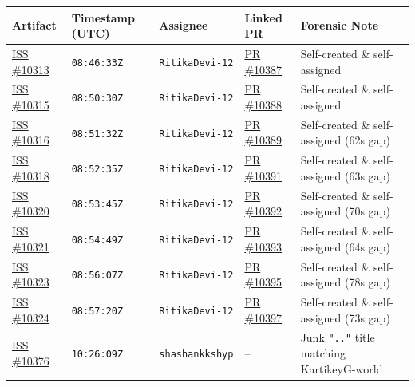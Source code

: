 \documentclass[11pt,a4paper]{article}
\begin{document}
\vspace{4pt}
\begin{center}
\small
\begin{tabular}{@{}llllp{6.4cm}@{}}
\toprule
\textbf{Artifact} & \textbf{Timestamp (UTC)} & \textbf{Assignee} & \textbf{Linked PR} & \textbf{Forensic Note} \\
\midrule
\href{https://github.com/SatyamPandey-07/WorkSphere/issues/10313}{ISS \#10313} & \texttt{08:46:33Z} & \texttt{RitikaDevi-12} & \href{https://github.com/SatyamPandey-07/WorkSphere/pull/10387}{PR \#10387} & Self-created \& self-assigned \\
\href{https://github.com/SatyamPandey-07/WorkSphere/issues/10315}{ISS \#10315} & \texttt{08:50:30Z} & \texttt{RitikaDevi-12} & \href{https://github.com/SatyamPandey-07/WorkSphere/pull/10388}{PR \#10388} & Self-created \& self-assigned \\
\href{https://github.com/SatyamPandey-07/WorkSphere/issues/10316}{ISS \#10316} & \texttt{08:51:32Z} & \texttt{RitikaDevi-12} & \href{https://github.com/SatyamPandey-07/WorkSphere/pull/10389}{PR \#10389} & Self-created \& self-assigned (62s gap) \\
\href{https://github.com/SatyamPandey-07/WorkSphere/issues/10318}{ISS \#10318} & \texttt{08:52:35Z} & \texttt{RitikaDevi-12} & \href{https://github.com/SatyamPandey-07/WorkSphere/pull/10391}{PR \#10391} & Self-created \& self-assigned (63s gap) \\
\href{https://github.com/SatyamPandey-07/WorkSphere/issues/10320}{ISS \#10320} & \texttt{08:53:45Z} & \texttt{RitikaDevi-12} & \href{https://github.com/SatyamPandey-07/WorkSphere/pull/10392}{PR \#10392} & Self-created \& self-assigned (70s gap) \\
\href{https://github.com/SatyamPandey-07/WorkSphere/issues/10321}{ISS \#10321} & \texttt{08:54:49Z} & \texttt{RitikaDevi-12} & \href{https://github.com/SatyamPandey-07/WorkSphere/pull/10393}{PR \#10393} & Self-created \& self-assigned (64s gap) \\
\href{https://github.com/SatyamPandey-07/WorkSphere/issues/10323}{ISS \#10323} & \texttt{08:56:07Z} & \texttt{RitikaDevi-12} & \href{https://github.com/SatyamPandey-07/WorkSphere/pull/10395}{PR \#10395} & Self-created \& self-assigned (78s gap) \\
\href{https://github.com/SatyamPandey-07/WorkSphere/issues/10324}{ISS \#10324} & \texttt{08:57:20Z} & \texttt{RitikaDevi-12} & \href{https://github.com/SatyamPandey-07/WorkSphere/pull/10397}{PR \#10397} & Self-created \& self-assigned (73s gap) \\
\href{https://github.com/SatyamPandey-07/WorkSphere/issues/10376}{ISS \#10376} & \texttt{10:26:09Z} & \texttt{shashankkshyp} & -- & Junk \texttt{".."} title matching KartikeyG-world \\
\bottomrule
\end{tabular}
\end{center}
\end{document}
